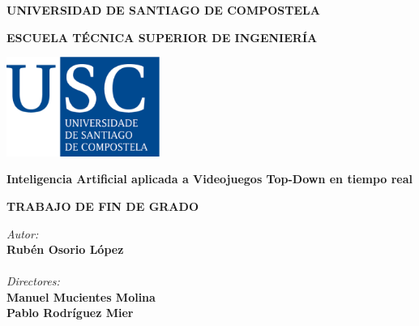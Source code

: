 \pagestyle{empty}
\begin{center}
{\bf\large UNIVERSIDAD DE SANTIAGO DE COMPOSTELA}

\vspace{0.5cm}
{\bf\large ESCUELA TÉCNICA SUPERIOR DE INGENIERÍA}

\vspace{1.5cm}
\includegraphics[width=5cm]{figuras/logo_usc.eps}

\vspace{1.5cm}
{\bf\LARGE Inteligencia Artificial aplicada a Videojuegos Top-Down en tiempo real}

\vspace{1cm}
{\bf\normalsize TRABAJO DE FIN DE GRADO}

\end{center}



\vfill
\begin{flushright}

{\it\small Autor:} \\
{\bf\small Rubén Osorio López} \\
~ \\
{\it\small Directores:} \\
{\bf\small Manuel Mucientes Molina} \\
{\bf\small Pablo Rodríguez Mier} \\
\end{flushright}
\clearpage

